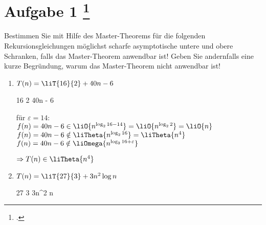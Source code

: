 \documentclass{lehramt-informatik-aufgabe}
\begin{document}
\let\O=\liO
\let\o=\liOmega
\let\T=\liT
\let\t=\liTheta

\section{Aufgabe 1
\footcite{66115:2011:03}}

Bestimmen Sie mit Hilfe des Master-Theorems für die folgenden
Rekursionsgleichungen möglichst scharfe asymptotische untere und obere
Schranken, falls das Master-Theorem anwendbar ist! Geben Sie andernfalls
eine kurze Begründung, warum das Master-Theorem nicht anwendbar ist!

\liMasterExkurs

\begin{enumerate}


\item $T(n) = \T{16}{2} + 40n - 6$

\begin{liAntwort}
\liMasterVariablenDeklaration
{16} %
{2} %
{40n - 6} %

\liMasterFallRechnung
{für $\varepsilon = 14$: \\
$f(n) = 40n - 6 \in \O{n^{\log_2 {16 - 14}}} = \O{n^{\log_2 2}} = \O{n}$}
{$f(n) = 40n - 6 \notin \t{n^{\log_2 {16}}} = \t{n^4}$}
{$f(n) = 40n - 6 \notin \o{n^{\log_2 {16 + \varepsilon}}}$}

$\Rightarrow T(n) \in \t{n^4}$

\end{liAntwort}




\item $T(n) = \T{27}{3} + 3n^2 \log n$

\begin{liAntwort}
\liMasterVariablenDeklaration
{27} %
{3} %
{3n^2 \log n} %

\liMasterFallRechnung
{}
{}
{}

\liMasterWolframLink{}
\end{liAntwort}


\end{enumerate}
\end{document}
